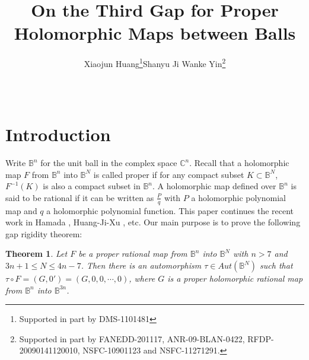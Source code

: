 \documentclass[12pt]{article}
\date{\ }
\numberwithin{equation}{section}
\def\BB{{\mathbb B}}
\def\CC{{\mathbb C}}
\newtheorem{theorem}{Theorem}[section]
\begin{document}
\title{\bf On the Third Gap
  for Proper Holomorphic Maps between Balls}

\author{{Xiaojun  Huang}\footnote{
Supported in part by DMS-1101481}\qquad  Shanyu Ji \qquad Wanke
Yin\footnote{Supported in part by  FANEDD-201117, ANR-09-BLAN-0422,
RFDP-20090141120010, NSFC-10901123 and NSFC-11271291.}}

  \maketitle










\section{Introduction}
Write $\mathbb{B}^{n}$ for the unit ball in the complex space
$\CC^{n}$. Recall that a holomorphic map $F$ from ${\BB}^n$ into
${\BB}^{N}$ is called proper if for any compact subset $K\subset
{\BB}^N$, $F^{-1}(K)$ is also a compact subset in ${\BB}^n$. A
holomorphic map defined over ${\BB}^n$ is said to be rational if it
can be written as $\frac{P}{q}$ with $P$ a holomorphic polynomial
map and $q$ a holomorphic polynomial function. This paper continues
the recent work  in  Hamada \cite{Ha1}, Huang-Ji-Xu \cite{HJX1},
etc. Our main purpose is to prove the following gap rigidity
theorem:


\begin{theorem} \label{thm1} Let $F$ be a proper  rational map from $\BB^{n}$
into $\BB^{N}$ with $n> 7$ and  $3n+1\le N\le 4n-7$.
Then there is an automorphism $\tau\in Aut({\BB}^N)$ such that
$\tau\circ F=(G,0')=(G,0,0,\cdots,0)$, where  $G$ is a  proper
holomorphic  rational map from ${\BB}^n$ into ${\BB}^{3n}$.
\end{theorem}
\end{document}
